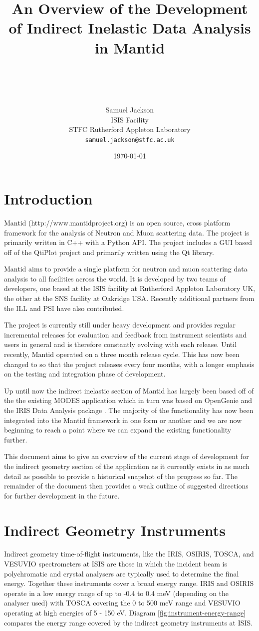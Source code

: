 \documentclass[paper=a4, fontsize=11pt]{scrartcl}	%
\title{ \vspace{-1in} 	\usefont{OT1}{bch}{b}{n}
		\huge \strut An Overview of the Development of Indirect Inelastic Data Analysis in Mantid\strut \\
}
\author{ 									\usefont{OT1}{bch}{m}{n}
        Samuel Jackson\\		\usefont{OT1}{bch}{m}{n}
		ISIS Facility\\	\usefont{OT1}{bch}{m}{n}
        STFC Rutherford Appleton Laboratory\\
        \texttt{samuel.jackson@stfc.ac.uk}
}
\date{\today}
\numberwithin{equation}{section}															%
\numberwithin{figure}{section}																%
\numberwithin{table}{section}																%
\begin{document}
\maketitle
\clearpage
\tableofcontents
\section{Introduction}
Mantid (http://www.mantidproject.org) is an open source, cross platform framework for the analysis of Neutron and Muon scattering data. The project is primarily written in C++ with a Python API. The project includes a GUI based off of the QtiPlot project and primarily written using the Qt library.

Mantid aims to provide a single platform for neutron and muon scattering data analysis to all facilities across the world. It is developed by two teams of developers, one based at the ISIS facility at Rutherford Appleton Laboratory UK, the other at the SNS facility at Oakridge USA. Recently additional partners from the ILL and PSI have also contributed.

The project is currently still under heavy development and provides regular incremental releases for evaluation and feedback from instrument scientists and users in general and is therefore constantly evolving with each release. Until recently, Mantid operated on a three month release cycle. This has now been changed to so that the project releases every four months, with a longer emphasis on the testing and integration phase of development.

Up until now the indirect inelastic section of Mantid has largely been based off of the the existing MODES application which in turn was based on OpenGenie\cite{wshowells2010} and the IRIS Data Analysis package \cite{wshowells1996}. The majority of the functionality has now been integrated into the Mantid framework in one form or another and we are now beginning to reach a point where we can expand the existing functionality further.

This document aims to give an overview of the current stage of development for the indirect geometry section of the application as it currently exists in as much detail as possible to provide a historical snapshot of the progress so far. The remainder of the document then provides a weak outline of suggested directions for further development in the future.

\section{Indirect Geometry Instruments}
Indirect geometry time-of-flight instruments, like the IRIS, OSIRIS, TOSCA, and VESUVIO spectrometers at ISIS are those in which the incident beam is polychromatic and crystal analysers are typically used to determine the final energy. Together these instruments cover a broad energy range. IRIS and OSIRIS operate in a low energy range of up to -0.4 to 0.4 meV (depending on the analyser used) with TOSCA covering the 0 to 500 meV range and VESUVIO operating at high energies of 5 - 150 eV. Diagram \ref{fig:instrument-energy-range} compares the energy range covered by the indirect geometry instruments at ISIS.
\end{document}
